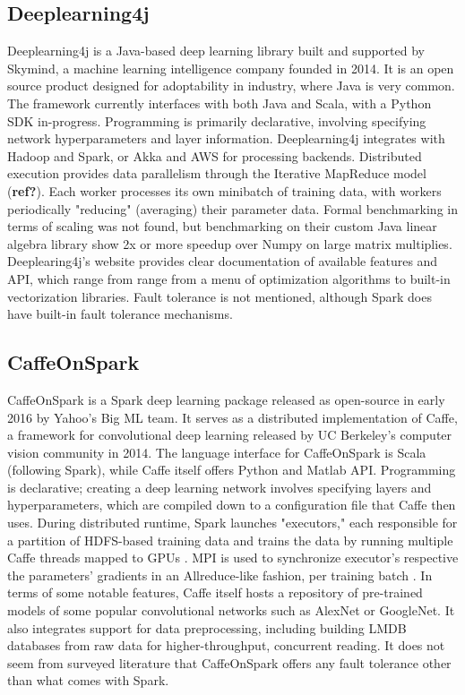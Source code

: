 \documentclass{article}
\begin{document}
\subsection{Deeplearning4j}
Deeplearning4j is a Java-based deep learning library built and supported by Skymind, a machine learning intelligence company founded in 2014. It is an open source product designed for adoptability in industry, where Java is very common. The framework currently interfaces with both Java and Scala, with a Python SDK in-progress. Programming is primarily declarative, involving specifying network hyperparameters and layer information. Deeplearning4j integrates with Hadoop and Spark, or Akka and AWS for processing backends. Distributed execution provides data parallelism through the Iterative MapReduce model (\textbf{ref?}). Each worker processes its own minibatch of training data, with workers periodically "reducing" (averaging) their parameter data. Formal benchmarking in terms of scaling was not found, but benchmarking on their custom Java linear algebra library show 2x or more speedup over Numpy on large matrix multiplies. Deeplearing4j's website provides clear documentation of available features and API, which range from range from a menu of optimization algorithms to built-in vectorization libraries. Fault tolerance is not mentioned, although Spark does have built-in fault tolerance mechanisms. 

\subsection{CaffeOnSpark}
CaffeOnSpark is a Spark deep learning package released as open-source in early 2016 by Yahoo's Big ML team. It serves as a distributed implementation of Caffe, a framework for convolutional deep learning released by UC Berkeley's computer vision community in 2014. The language interface for CaffeOnSpark is Scala (following Spark), while Caffe itself offers Python and Matlab API. Programming is declarative; creating a deep learning network involves specifying layers and hyperparameters, which are compiled down to a configuration file that Caffe then uses. During distributed runtime, Spark launches "executors," each responsible for a partition of HDFS-based training data and trains the data by running multiple Caffe threads mapped to GPUs \cite{Large52:online}. MPI is used to synchronize executor's respective the parameters' gradients in an Allreduce-like fashion, per training batch \cite{Caffe27:online}. In terms of some notable features, Caffe itself hosts a repository of pre-trained models of some popular convolutional networks such as AlexNet or GoogleNet. It also integrates support for data preprocessing, including building LMDB databases from raw data for higher-throughput, concurrent reading. It does not seem from surveyed literature that CaffeOnSpark offers any fault tolerance other than what comes with Spark.
\end{document}
